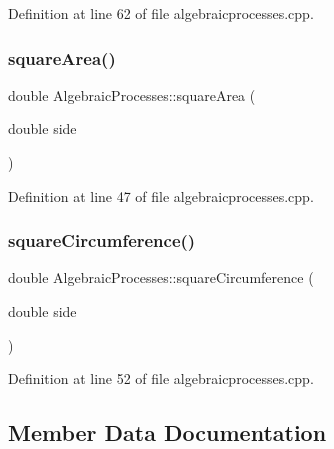 Definition at line 62 of file algebraicprocesses.\+cpp.

\mbox{\label{class_algebraic_processes_a9adf590f2f20c117034991ab2680af2a}} 
\subsubsection{\texorpdfstring{square\+Area()}{squareArea()}}
{\footnotesize\ttfamily double Algebraic\+Processes\+::square\+Area (\begin{DoxyParamCaption}\item[{double}]{side }\end{DoxyParamCaption})}



Definition at line 47 of file algebraicprocesses.\+cpp.

\mbox{\label{class_algebraic_processes_ace12d0a56d85541489c2c6370193417b}} 
\subsubsection{\texorpdfstring{square\+Circumference()}{squareCircumference()}}
{\footnotesize\ttfamily double Algebraic\+Processes\+::square\+Circumference (\begin{DoxyParamCaption}\item[{double}]{side }\end{DoxyParamCaption})}



Definition at line 52 of file algebraicprocesses.\+cpp.



\subsection{Member Data Documentation}
\mbox{\label{class_algebraic_processes_a53265d1c47fc7c240295615f2e994980}} 

